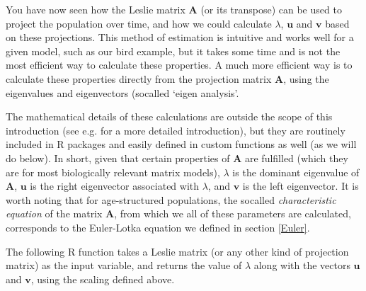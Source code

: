 \documentclass[
]{book}
\begin{document}
You have now seen how the Leslie matrix \(\mathbf{A}\) (or its transpose) can be used to project the population over time, and how we could calculate \(\lambda\), \(\mathbf{u}\) and \(\mathbf{v}\) based on these projections. This method of estimation is intuitive and works well for a given model, such as our bird example, but it takes some time and is not the most efficient way to calculate these properties. A much more efficient way is to calculate these properties directly from the projection matrix \(\mathbf{A}\), using the eigenvalues and eigenvectors (socalled `eigen analysis'.

The mathematical details of these calculations are outside the scope of this introduction (see e.g. \citet{Caswell1} for a more detailed introduction), but they are routinely included in R packages and easily defined in custom functions as well (as we will do below). In short, given that certain properties of \(\mathbf{A}\) are fulfilled (which they are for most biologically relevant matrix models), \(\lambda\) is the dominant eigenvalue of \(\mathbf{A}\), \(\mathbf{u}\) is the right eigenvector associated with \(\lambda\), and \(\mathbf{v}\) is the left eigenvector. It is worth noting that for age-structured populations, the socalled \emph{characteristic equation} of the matrix \(\mathbf{A}\), from which we all of these parameters are calculated, corresponds to the Euler-Lotka equation we defined in section \ref{Euler}.

The following R function takes a Leslie matrix (or any other kind of projection matrix) as the input variable, and returns the value of \(\lambda\) along with the vectors \(\mathbf{u}\) and \(\mathbf{v}\), using the scaling defined above.
\end{document}
